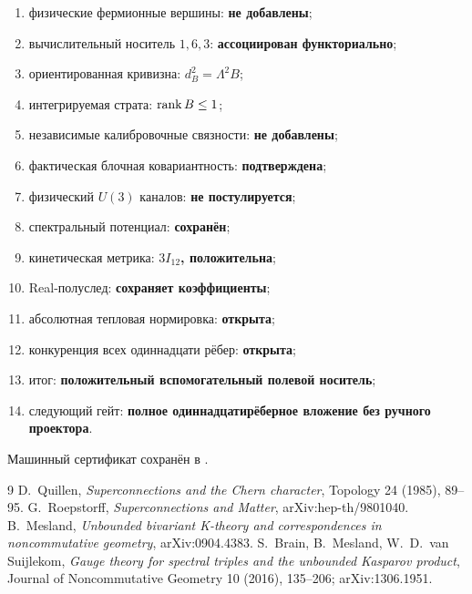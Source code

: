 \begin{protocol}
\begin{enumerate}
 \item физические фермионные вершины: \textbf{не добавлены};
 \item вычислительный носитель $1,6,3$: \textbf{ассоциирован функториально};
 \item ориентированная кривизна: \textbf{$d_B^2=\Lambda^2B$};
 \item интегрируемая страта: \textbf{$\operatorname{rank} B\leq1$};
 \item независимые калибровочные связности: \textbf{не добавлены};
 \item фактическая блочная ковариантность: \textbf{подтверждена};
 \item физический $U(3)$ каналов: \textbf{не постулируется};
 \item спектральный потенциал: \textbf{сохранён};
 \item кинетическая метрика: \textbf{$3I_{12}$, положительна};
 \item Real-полуслед: \textbf{сохраняет коэффициенты};
 \item абсолютная тепловая нормировка: \textbf{открыта};
 \item конкуренция всех одиннадцати рёбер: \textbf{открыта};
 \item итог: \textbf{положительный вспомогательный полевой носитель};
 \item следующий гейт: \textbf{полное одиннадцатирёберное вложение без
 ручного проектора}.
\end{enumerate}
\end{protocol}

Машинный сертификат сохранён в
.

\begin{thebibliography}{9}
D.~Quillen,
\emph{Superconnections and the Chern character},
Topology 24 (1985), 89--95.
G.~Roepstorff,
\emph{Superconnections and Matter}, arXiv:hep-th/9801040.
B.~Mesland,
\emph{Unbounded bivariant K-theory and correspondences in noncommutative
geometry}, arXiv:0904.4383.
S.~Brain, B.~Mesland, W.~D.~van Suijlekom,
\emph{Gauge theory for spectral triples and the unbounded Kasparov product},
Journal of Noncommutative Geometry 10 (2016), 135--206;
arXiv:1306.1951.
\end{thebibliography}